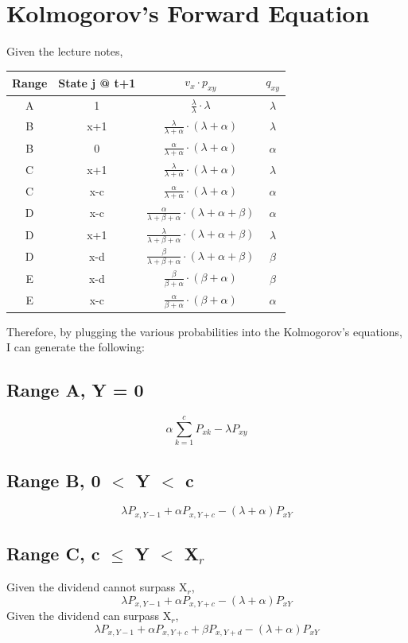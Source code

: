 \documentclass[]{article}
\begin{document}
\section{Kolmogorov's Forward Equation}
Given the lecture notes, 
\begin{center}
	\begin{tabular}{|| c | c | c | c ||} 
		\hline
		Range & State j @ t+1 & $v_x\cdot p_{xy}$ & $q_{xy}$\\ [0.5ex] 
		\hline\hline
		A & 1 & $\frac{\lambda}{\lambda} \cdot \lambda$ & $\lambda$ \\ 
		\hline
		B & x+1 & $\frac{\lambda}{\lambda + \alpha} \cdot (\lambda + \alpha)$ & $\lambda$\\
		\hline
		B & 0 & $\frac{\alpha}{\lambda + \alpha}\cdot (\lambda + \alpha)$ & $\alpha$ \\
		\hline
		C & x+1 & $\frac{\lambda}{\lambda + \alpha} \cdot (\lambda + \alpha)$ & $\lambda$\\
		\hline
		C & x-c & $\frac{\alpha}{\lambda + \alpha}\cdot (\lambda + \alpha)$ & $\alpha$\\
		\hline
		D & x-c & $\frac{\alpha}{\lambda + \beta + \alpha}\cdot (\lambda + \alpha + \beta)$& $\alpha$\\ 
		\hline
		D & x+1 & $\frac{\lambda}{\lambda + \beta + \alpha}\cdot (\lambda + \alpha + \beta)$& $\lambda$\\ 
		\hline
		D & x-d & $\frac{\beta}{\lambda + \beta + \alpha}\cdot (\lambda + \alpha + \beta)$& $\beta$\\ 
		\hline
		E & x-d & $\frac{\beta}{\beta + \alpha}\cdot (\beta + \alpha)$& $\beta$\\
		\hline
		E & x-c & $\frac{\alpha}{\beta + \alpha}\cdot (\beta + \alpha)$& $\alpha$\\[.5ex] 
		\hline
	\end{tabular}
\end{center}
Therefore, by plugging the various probabilities into the Kolmogorov's equations, I can generate the following:
\subsection{Range A, Y = 0}
$$\alpha\sum_{k=1}^{c} P_{xk}-\lambda P_{xy}$$
\subsection{Range B, 0 $<$ Y $<$ c}
$$\lambda P_{x,Y-1} + \alpha P_{x, Y+c} - (\lambda + \alpha)P_{xY}$$
\subsection{Range C, c $\leq$ Y $<$ X$_r$}
Given the dividend cannot surpass X$_r$,
$$\lambda P_{x,Y-1} + \alpha P_{x, Y+c} - (\lambda + \alpha)P_{xY}$$
Given the dividend can surpass X$_r$,
$$\lambda P_{x,Y-1} + \alpha P_{x, Y+c} + \beta P_{x, Y+d} - (\lambda + \alpha)P_{xY}$$
\end{document}
